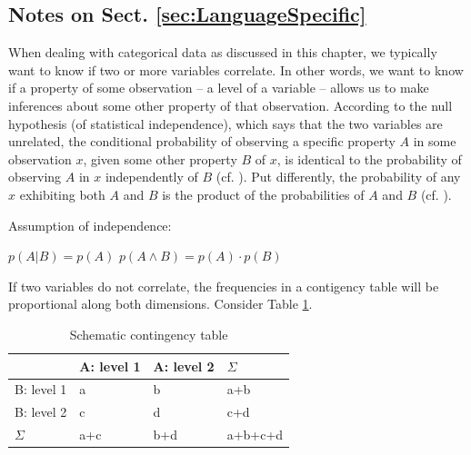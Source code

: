 
\begin{paperappendix}
\section{}

\subsection{Notes on Sect. \ref{sec:LanguageSpecific}}\label{sec:PearsonResds}


When dealing with categorical data as discussed in this chapter, we
typically want to know if two or more variables correlate. In other
words, we want to know if a property of some observation -- a level of
a variable -- allows us to make inferences about some other property
of that observation.
%
According to the null hypothesis (of statistical independence), which
says that the two variables are unrelated, the conditional probability
of observing a specific property $A$ in some observation $x$, given
some other property $B$ of $x$, is identical to the probability of
observing $A$ in $x$ independently of $B$ (cf. ). Put
differently, the probability of any $x$ exhibiting both $A$ and $B$ is
the product of the probabilities of $A$ and $B$ (cf. ).

\begin{exe}
  \ex\label{indep} Assumption of independence:
  \begin{xlist}
    \ex\label{condprob} $p(A|B)=p(A)$
    \ex\label{conjprob} $p(A\wedge B) = p(A)\cdot p(B)$
  \end{xlist}
\end{exe}
%
If two variables do not correlate, the frequencies in a
contigency table will be proportional along both dimensions.
Consider Table \ref{tab:contingencyschema}.
%

\begin{table}[h]
  \begin{tabular}[h]{l|ll|l}
          &  A: level 1 & A: level 2 & $\Sigma$\\\hline
    B: level 1   &  a & b & a+b\\
    B: level 2   &  c & d & c+d\\\hline
    $\Sigma$ & a+c & b+d & a+b+c+d\\
  \end{tabular}
  \caption{Schematic contingency table}
    \label{tab:contingencyschema}
\end{table}


\end{paperappendix}
